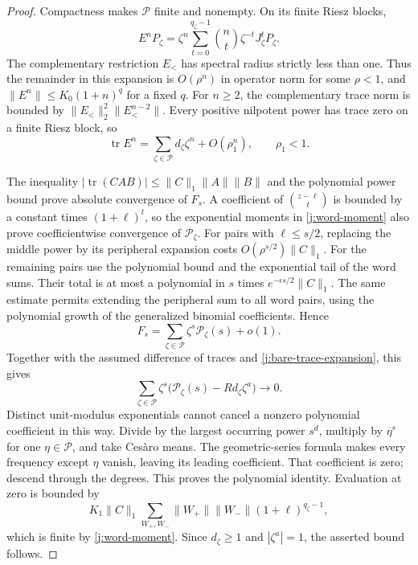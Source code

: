 \begin{proof}
Compactness makes $\mathcal P$ finite and nonempty. On its finite Riesz
blocks,
\[
 E^nP_\zeta=\zeta^n\sum_{t=0}^{q_\zeta-1}
 \binom nt\zeta^{-t}J_\zeta^tP_\zeta.
\]
The complementary restriction $E_<$ has spectral radius strictly less
than one. Thus the remainder in this expansion is $O(\rho^n)$ in
operator norm for some $\rho<1$, and
$\|E^n\|\le K_0(1+n)^q$ for a fixed $q$.
For $n\ge2$, the complementary trace norm is bounded by
$\|E_<\|_2^2\|E_<^{n-2}\|$. Every positive nilpotent power has trace zero
on a finite Riesz block, so
\begin{equation}\label{j:bare-trace-expansion}
 \operatorname{tr}E^n=\sum_{\zeta\in\mathcal P}
 d_\zeta\zeta^n+O(\rho_1^n),\qquad \rho_1<1.
\end{equation}

The inequality $|\operatorname{tr}(CAB)|\le\|C\|_1\|A\|\|B\|$
and the polynomial power bound prove absolute convergence of $F_s$.
A coefficient of $\binom{z-\ell}{t}$ is bounded by a constant times
$(1+\ell)^t$, so the exponential moments in \eqref{j:word-moment}
also prove coefficientwise convergence of $\mathcal P_\zeta$.
For pairs with $\ell\le s/2$, replacing the middle power by its
peripheral expansion costs $O(\rho^{s/2})\|C\|_1$. For the remaining
pairs use the polynomial bound and the exponential tail of the word
sums. Their total is at most a polynomial in $s$ times
$e^{-\epsilon s/2}\|C\|_1$. The same estimate permits extending the
peripheral sum to all word pairs, using the polynomial growth of the
generalized binomial coefficients. Hence
\[
 F_s=\sum_{\zeta\in\mathcal P}\zeta^s\mathcal P_\zeta(s)+o(1).
\]
Together with the assumed difference of traces and
\eqref{j:bare-trace-expansion}, this gives
\[
 \sum_{\zeta\in\mathcal P}\zeta^s
 \big(\mathcal P_\zeta(s)-Rd_\zeta\zeta^a\big)\longrightarrow0.
\]
Distinct unit-modulus exponentials cannot cancel a nonzero polynomial
coefficient in this way. Divide by the largest occurring power $s^d$,
multiply by $\overline\eta^{s}$ for one $\eta\in\mathcal P$, and take
Ces\`aro means. The geometric-series formula makes every frequency
except $\eta$ vanish, leaving its leading coefficient. That coefficient
is zero; descend through the degrees. This proves the polynomial
identity. Evaluation at zero is bounded by
\[
 K_1\|C\|_1\sum_{W_+,W_-}
 \|W_+\|\|W_-\|(1+\ell)^{q_\zeta-1},
\]
which is finite by \eqref{j:word-moment}. Since $d_\zeta\ge1$ and
$|\zeta^a|=1$, the asserted bound follows.
\end{proof}
